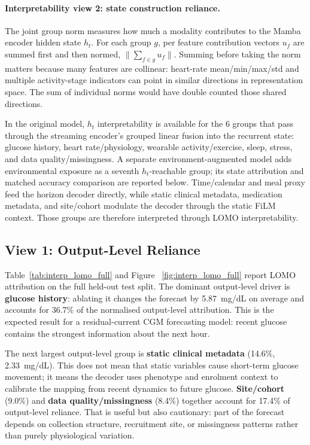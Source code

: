 \paragraph{Interpretability view 2: state construction reliance.}
The joint group norm measures how much a modality contributes to the
Mamba encoder hidden state $h_t$.
For each group $g$, per feature contribution vectors $u_f$ are summed first and
then normed, $\lVert\sum_{f\in g}u_f\rVert$.
Summing before taking the norm matters because many features are collinear:
heart-rate mean/min/max/std and multiple activity-stage indicators can point in
similar directions in representation space. The sum of individual norms would have double counted those shared directions.

In the original model, $h_t$ interpretability is available for the 6 groups
that pass through the streaming encoder's grouped linear fusion into the
recurrent state: glucose history, heart rate/physiology, wearable
activity/exercise, sleep, stress, and data quality/missingness. A separate
environment-augmented model adds environmental exposure as a seventh
$h_t$-reachable group; its state attribution and matched accuracy comparison
are reported below.
Time/calendar and meal proxy feed the horizon decoder directly, while static
clinical metadata, medication metadata, and site/cohort modulate the decoder
through the static FiLM context.
Those groups are therefore interpreted through LOMO interpretability.


\subsection{View 1: Output-Level Reliance}
\label{subsec:interp_lomo}

Table~\ref{tab:interp_lomo_full} and Figure ~\ref{fig:interp_lomo_full} report
LOMO attribution on the full held-out test split.
The dominant output-level driver is \textbf{glucose history}: ablating it
changes the forecast by 5.87~mg/dL on average and accounts for 36.7\% of the
normalised output-level attribution.
This is the expected result for a residual-current CGM forecasting model:
recent glucose contains the strongest information about the next hour.

The next largest output-level group is \textbf{static clinical metadata}
(14.6\%, 2.33~mg/dL).
This does not mean that static variables cause short-term glucose movement;
it means the decoder uses phenotype and enrolment context to calibrate the
mapping from recent dynamics to future glucose.
\textbf{Site/cohort} (9.0\%) and \textbf{data quality/missingness} (8.4\%)
together account for 17.4\% of output-level reliance.
That is useful but also cautionary: part of the forecast depends on collection
structure, recruitment site, or missingness patterns rather than purely
physiological variation.

